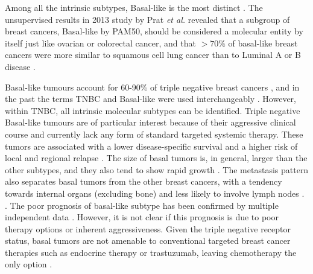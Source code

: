 Among all the intrinsic subtypes, Basal-like is the most distinct \cite{TCGAComprehensiveTumors}. The unsupervised results in 2013 study by Prat \textit{et al.} \cite{prat2013genomic}  revealed that a subgroup of breast cancers, Basal-like by PAM50, should be considered a molecular entity by itself just like ovarian or colorectal cancer, and that $>70\%$ of basal-like breast cancers were more similar to squamous cell lung cancer than to Luminal A or B disease \cite{prat2013genomic}. 

Basal-like tumours account for 60-90\% of triple negative breast cancers \cite{fan2006concordance}, and in the past the terms TNBC and Basal-like were used interchangeably \cite{Vidal2017}. However, within TNBC, all intrinsic molecular subtypes can be identified. 
Triple negative Basal-like tumours are of particular interest because of their aggressive clinical course and currently lack any form of standard targeted systemic therapy. These tumors are associated with a lower disease-specific survival and a higher risk of local and regional relapse \cite{hudis2011triple}. 
The size of basal tumors is, in general, larger than the other subtypes\cite{rakha2006morphological}, and they also tend to show rapid growth \cite{ho2012characterization}. The metastasis pattern also separates basal tumors from the other breast cancers, with a tendency towards internal organs (excluding bone) and less likely to involve lymph nodes \cite{ho2012characterization}. 
.
The poor prognosis of basal-like subtype  has been confirmed by multiple independent data \cite{brenton2005molecular}. However, it is not clear if this prognosis is due to poor therapy options or inherent aggressiveness. Given the triple negative receptor status,  basal tumors are not amenable to conventional targeted breast cancer therapies such as endocrine therapy or trastuzumab, leaving chemotherapy the only option \cite{brenton2005molecular, Dai2015}. \\


